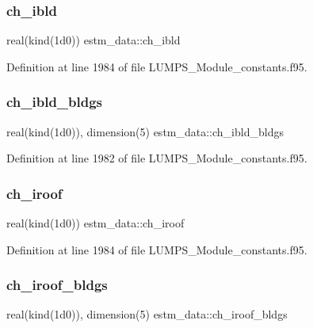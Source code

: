 \subsubsection{\texorpdfstring{ch\+\_\+ibld}{ch\_ibld}}
{\footnotesize\ttfamily real(kind(1d0)) estm\+\_\+data\+::ch\+\_\+ibld}



Definition at line 1984 of file L\+U\+M\+P\+S\+\_\+\+Module\+\_\+constants.\+f95.

\mbox{\label{namespaceestm__data_af2ac546e3106a586466309672adaf39d}} 
\subsubsection{\texorpdfstring{ch\+\_\+ibld\+\_\+bldgs}{ch\_ibld\_bldgs}}
{\footnotesize\ttfamily real(kind(1d0)), dimension(5) estm\+\_\+data\+::ch\+\_\+ibld\+\_\+bldgs}



Definition at line 1982 of file L\+U\+M\+P\+S\+\_\+\+Module\+\_\+constants.\+f95.

\mbox{\label{namespaceestm__data_aaad79d582a2d1bb00347adf79ad73de6}} 
\subsubsection{\texorpdfstring{ch\+\_\+iroof}{ch\_iroof}}
{\footnotesize\ttfamily real(kind(1d0)) estm\+\_\+data\+::ch\+\_\+iroof}



Definition at line 1984 of file L\+U\+M\+P\+S\+\_\+\+Module\+\_\+constants.\+f95.

\mbox{\label{namespaceestm__data_a7c4af2b5cebe1fd3c88b2c60f8064fd0}} 
\subsubsection{\texorpdfstring{ch\+\_\+iroof\+\_\+bldgs}{ch\_iroof\_bldgs}}
{\footnotesize\ttfamily real(kind(1d0)), dimension(5) estm\+\_\+data\+::ch\+\_\+iroof\+\_\+bldgs}



